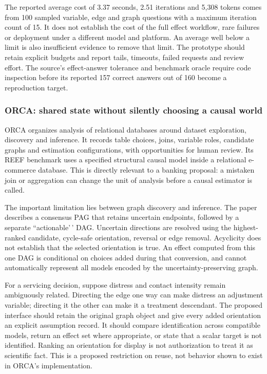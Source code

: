 The reported average cost of 3.37 seconds, 2.51 iterations and 5,308
tokens comes from 100 sampled variable, edge and graph questions with a
maximum iteration count of 15. It does not establish the cost of the
full effect workflow, rare failures or deployment under a different
model and platform. An average well below a limit is also insufficient
evidence to remove that limit. The prototype should retain explicit
budgets and report tails, timeouts, failed requests and review effort.
The source's effect-answer tolerance and benchmark oracle require code
inspection before its reported 157 correct answers out of 160 become a
reproduction target. \cite{exec13_census_causal_agent}

\hypertarget{orca-shared-state-without-silently-choosing-a-causal-world}{%
\subsubsection{ORCA: shared state without silently choosing a causal
world}\label{orca-shared-state-without-silently-choosing-a-causal-world}}

ORCA organizes analysis of relational databases around dataset
exploration, discovery and inference. It records table choices, joins,
variable roles, candidate graphs and estimation configurations, with
opportunities for human review. Its REEF benchmark uses a specified
structural causal model inside a relational e-commerce database. This is
directly relevant to a banking proposal: a mistaken join or aggregation
can change the unit of analysis before a causal estimator is called.
\cite{exec13_census_orca}

The important limitation lies between graph discovery and inference. The
paper describes a consensus PAG that retains uncertain endpoints,
followed by a separate ``actionable'\,' DAG. Uncertain directions are
resolved using the highest-ranked candidate, cycle-safe orientation,
reversal or edge removal. Acyclicity does not establish that the
selected orientation is true. An effect computed from this one DAG is
conditional on choices added during that conversion, and cannot
automatically represent all models encoded by the uncertainty-preserving
graph.

For a servicing decision, suppose distress and contact intensity remain
ambiguously related. Directing the edge one way can make distress an
adjustment variable; directing it the other can make it a treatment
descendant. The proposed interface should retain the original graph
object and give every added orientation an explicit assumption record.
It should compare identification across compatible models, return an
effect set where appropriate, or state that a scalar target is not
identified. Ranking an orientation for display is not authorization to
treat it as scientific fact. This is a proposed restriction on reuse,
not behavior shown to exist in ORCA's implementation.

